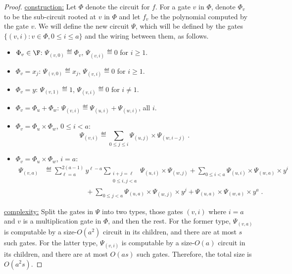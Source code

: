 \documentclass{toc}
\begin{document}
\begin{proof}
        \uline{construction:} Let $\Phi$ denote the circuit for $f$. For a gate $v$ in $\Phi$, denote $\Phi_v$ to be the sub-circuit rooted at $v$ in $\Phi$ and let $f_v$   be the polynomial computed by the gate $v$.  We will define the new circuit $\Psi$, which will be defined by the gates $\{(v,i): v\in\Phi, 0\le i\le a\}$ and the wiring between them, as follows.
        \begin{itemize}
                \item $\Phi_v\in\F$: $\Psi_{(v,0)}\eqdef \Phi_v$, $\Psi_{(v,i)}\eqdef 0$ for $i\ge 1$.
                \item $\Phi_v=x_j$: $\Psi_{(v,0)}\eqdef x_j$, $\Psi_{(v,i)}\eqdef 0$ for $i\ge 1$.
                \item $\Phi_v=y$: $\Psi_{(v,1)}\eqdef 1$, $\Psi_{(v,i)}\eqdef 0$ for $i\ne 1$.
                \item $\Phi_v=\Phi_u+\Phi_w$: $\Psi_{(v,i)}\eqdef \Psi_{(u,i)}+\Psi_{(w,i)}$, all $i$.
                \item $\Phi_v=\Phi_u\times \Phi_w$, $0\le i<a$:
                        \[
                                \Psi_{(v,i)}\eqdef \sum_{0\le j\le i}\Psi_{(u,j)}\times\Psi_{(w,i-j)}
                                \;.
                        \]
                \item $\Phi_v=\Phi_u\times \Phi_w$, $i=a$:
                        \begin{align*}
                                \Psi_{(v,a)}
                                &\eqdef \sum_{\ell=a}^{2(a-1)}y^{\ell-a}\sum_{\substack{i+j=\ell\\0\le i,j< a}}\Psi_{(u,i)}\times\Psi_{(w,j)}
                                        + \sum_{0\le i<a} \Psi_{(u,i)}\times\Psi_{(w,a)}\times y^i\\
                                &\hspace{1in}+ \sum_{0\le j<a} \Psi_{(u,a)}\times\Psi_{(w,j)}\times y^j
                                        +\Psi_{(u,a)}\times\Psi_{(w,a)}\times y^a
                                \;.
                        \end{align*}
        \end{itemize}

        \uline{complexity:} Split the gates in $\Psi$ into two types, those gates $(v,i)$ where $i=a$ and $v$ is a multiplication gate in $\Phi$, and then the rest.  For the former type, $\Psi_{(v,a)}$ is computable by a size-$O(a^2)$ circuit in its children, and there are at most $s$ such gates.  For the latter type, $\Psi_{(v,i)}$ is computable by a size-$O(a)$ circuit in its children, and there are at most $O(as)$ such gates.
Therefore, %
the total size is $O(a^2s)$.
%



\end{proof}
\end{document}
